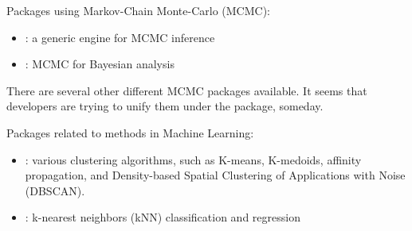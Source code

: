 Packages using Markov-Chain Monte-Carlo (MCMC):
\begin{itemize}
\item \href{https://github.com/JuliaStats/Lora.jl}{}: a generic engine for MCMC inference
\item \href{https://github.com/brian-j-smith/Mamba.jl}{}: MCMC for Bayesian analysis
\end{itemize}
There are several other different MCMC packages available. It seems that developers are trying to unify them under the  package, someday.

Packages related to methods in Machine Learning:
\begin{itemize}
\item \href{https://github.com/JuliaStats/Clustering.jl}{}: various clustering algorithms, such as K-means, K-medoids, affinity propagation, and Density-based Spatial Clustering of Applications with Noise (DBSCAN).
\item \href{https://github.com/johnmyleswhite/kNN.jl}{}: k-nearest neighbors (kNN) classification and regression
\end{itemize}
